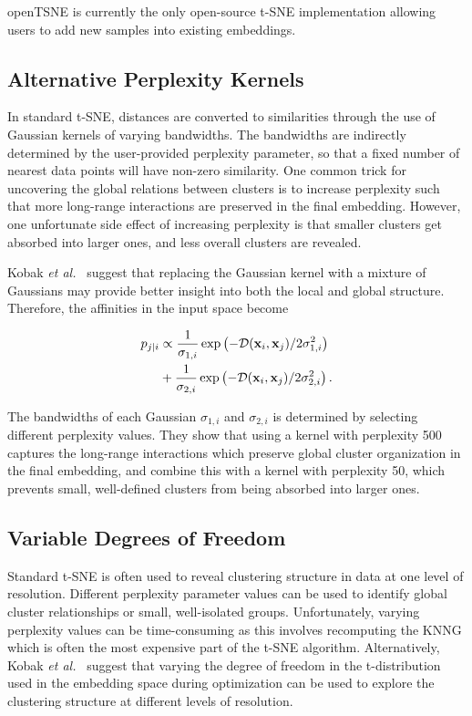 \documentclass[twocolumn]{bmcart}
\begin{document}
openTSNE is currently the only open-source t-SNE implementation allowing users to add new samples into existing embeddings.

\subsection*{Alternative Perplexity Kernels}

In standard t-SNE, distances are converted to similarities through the use of Gaussian kernels of varying bandwidths. The bandwidths are indirectly determined by the user-provided perplexity parameter, so that a fixed number of nearest data points will have non-zero similarity. One common trick for uncovering the global relations between clusters is to increase perplexity such that more long-range interactions are preserved in the final embedding. However, one unfortunate side effect of increasing perplexity is that smaller clusters get absorbed into larger ones, and less overall clusters are revealed.

Kobak \textit{et al.}~\cite{kobak2019art} suggest that replacing the Gaussian kernel with a mixture of Gaussians may provide better insight into both the local and global structure. Therefore, the affinities in the input space become

\begin{align}
  p_{j\mid i} &\propto \frac{1}{\sigma_{1,i}} \exp \left ( -\mathcal{D}(\mathbf{x}_i, \mathbf{x}_j ) / 2\sigma_{1,i}^2 \right ) \notag \\
  &+ \frac{1}{\sigma_{2,i}} \exp \left ( -\mathcal{D}(\mathbf{x}_i, \mathbf{x}_j ) / 2\sigma_{2,i}^2 \right ).
\end{align}

The bandwidths of each Gaussian $\sigma_{1,i}$ and $\sigma_{2,i}$ is determined by selecting different perplexity values. They show that using a kernel with perplexity 500 captures the long-range interactions which preserve global cluster organization in the final embedding, and combine this with a kernel with perplexity 50, which prevents small, well-defined clusters from being absorbed into larger ones.

\subsection*{Variable Degrees of Freedom}

Standard t-SNE is often used to reveal clustering structure in data at one level of resolution. Different perplexity parameter values can be used to identify global cluster relationships or small, well-isolated groups. Unfortunately, varying perplexity values can be time-consuming as this involves recomputing the KNNG which is often the most expensive part of the t-SNE algorithm. Alternatively,  Kobak \textit{et al.}~\cite{kobak2019heavy} suggest that varying the degree of freedom in the t-distribution used in the embedding space during optimization can be used to explore the clustering structure at different levels of resolution. 
\end{document}
